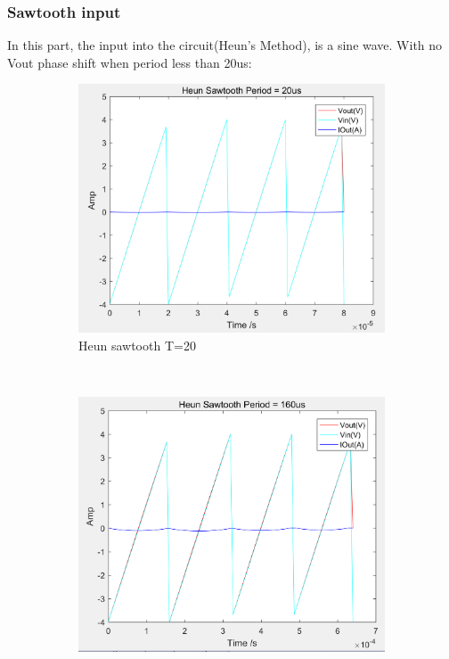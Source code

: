\documentclass[a4paper, 12pt]{article}
\begin{document}
\newpage
\subsubsection{Sawtooth input}
In this part, the input into the circuit(Heun's Method), is a sine wave. With no Vout phase shift when period less than 20us:
\begin{figure}[h]
      \centering
      \begin{subfigure}[b]{0.4\textwidth}
            \includegraphics[width=\textwidth]{ex1/heun_sawtooth_20.PNG}
            \caption{Heun sawtooth T=20}
      \end{subfigure}
      ~
      \begin{subfigure}[b]{0.4\textwidth}
            \includegraphics[width=\textwidth]{ex1/heun_sawtooth_160.PNG}

\end{subfigure}
\end{figure}
\end{document}
